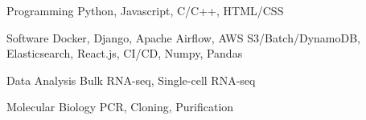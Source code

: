 

\begin{cvskills}

  \cvskill
    {Programming} %
    {Python, Javascript, C/C++, HTML/CSS} %

  \cvskill
    {Software} %
    {Docker, Django, Apache Airflow, AWS S3/Batch/DynamoDB, Elasticsearch, React.js, CI/CD, Numpy, Pandas} %

  \cvskill
    {Data Analysis} %
    {Bulk RNA-seq, Single-cell RNA-seq} %

  \cvskill
    {Molecular Biology} %
    {PCR, Cloning, Purification} %

\end{cvskills}
